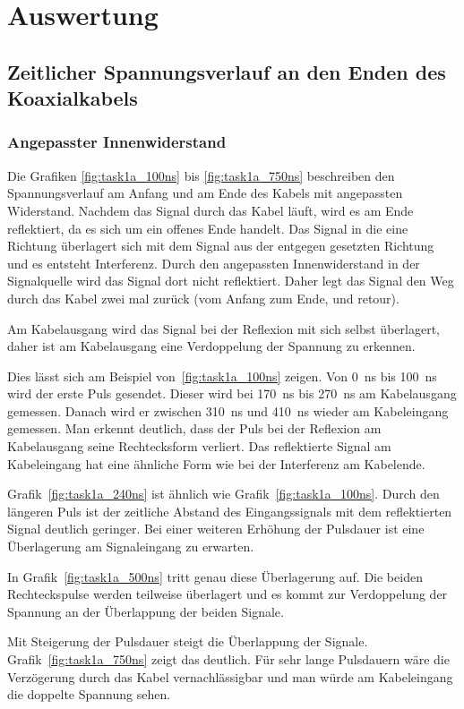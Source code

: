 \documentclass{article}
\begin{document}
\section{Auswertung}

\subsection{Zeitlicher Spannungsverlauf an den Enden des Koaxialkabels}

\subsubsection{Angepasster Innenwiderstand}
Die Grafiken \ref{fig:task1a_100ns} bis \ref{fig:task1a_750ns} beschreiben den Spannungsverlauf am Anfang und am Ende des Kabels mit angepassten Widerstand. Nachdem das Signal durch das Kabel läuft, wird es am Ende reflektiert, da es sich um ein offenes Ende handelt. Das Signal in die eine Richtung überlagert sich mit dem Signal aus der entgegen gesetzten Richtung und es entsteht Interferenz. Durch den angepassten Innenwiderstand in der Signalquelle wird das Signal dort nicht reflektiert. Daher legt das Signal den Weg durch das Kabel zwei mal zurück (vom Anfang zum Ende, und retour).

Am Kabelausgang wird das Signal bei der Reflexion mit sich selbst überlagert, daher ist am Kabelausgang eine Verdoppelung der Spannung zu erkennen.

Dies lässt sich am Beispiel von~\ref{fig:task1a_100ns} zeigen. Von 0~ns bis 100~ns wird der erste Puls gesendet. Dieser wird bei 170~ns bis 270~ns am Kabelausgang gemessen. Danach wird er zwischen 310~ns und 410~ns wieder am Kabeleingang gemessen. Man erkennt deutlich, dass der Puls bei der Reflexion am Kabelausgang seine Rechtecksform verliert. Das reflektierte Signal am Kabeleingang hat eine ähnliche Form wie bei der Interferenz am Kabelende.


Grafik~\ref{fig:task1a_240ns} ist ähnlich wie Grafik~\ref{fig:task1a_100ns}. Durch den längeren Puls ist der zeitliche Abstand des Eingangssignals mit dem reflektierten Signal deutlich geringer. Bei einer weiteren Erhöhung der Pulsdauer ist eine Überlagerung am Signaleingang zu erwarten.

In Grafik~\ref{fig:task1a_500ns} tritt genau diese Überlagerung auf. Die beiden Rechteckspulse werden teilweise überlagert und es kommt zur Verdoppelung der Spannung an der Überlappung der beiden Signale.

Mit Steigerung der Pulsdauer steigt die Überlappung der Signale. Grafik~\ref{fig:task1a_750ns} zeigt das deutlich. Für sehr lange Pulsdauern wäre die Verzögerung durch das Kabel vernachlässigbar und man würde am Kabeleingang die doppelte Spannung sehen.
\end{document}
